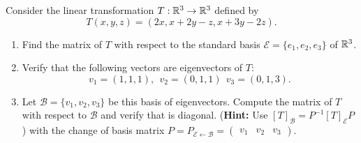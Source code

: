 \documentclass[a4paper]{article}
\begin{document}
\begin{problem}
    Consider the linear transformation \( T: \mathbb{R}^{3} \to \mathbb{R}^{3} \) defined by
    \[  T(x,y,z) = (2x, x + 2y - z, x+ 3y - 2z). \]
    \begin{enumerate}
        \item Find the matrix of \( T  \) with respect to the standard basis \( \mathcal{E} = \{ {e}_{1}, {e}_{2}, {e}_{3} \}  \) of \( \mathbb{R}^{3} \).
        \item Verify that the following vectors are eigenvectors of \( T  \): 
            \[  {v}_{1} = (1,1,1), \ \ {v}_{2} = (0,1,1) \ \ {v}_{3} = (0,1,3).  \]
        \item Let \( \mathcal{B}  = \{  {v}_{1}, {v}_{2}, {v}_{3} \}  \) be this basis of eigenvectors. Compute the matrix of \( T  \) with respect to \( \mathcal{B} \) and verify that is diagonal. (\textbf{Hint:} Use \( [T]_{\mathcal{B}} = P^{-1} [T]_{\mathcal{E}} P     \)) with the change of basis matrix \( P = P_{\mathcal{E} \leftarrow \mathcal{B}} = \begin{pmatrix} {v}_{1} & {v}_{2} & {v}_{3} \end{pmatrix}  \).
    \end{enumerate}
\end{problem}
\end{document}
